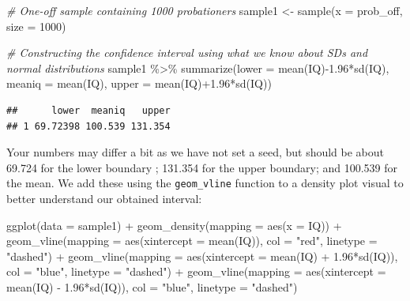 \documentclass[
]{book}
\newenvironment{Shaded}{\begin{snugshade}}{\end{snugshade}}
\newcommand{\AttributeTok}[1]{\textcolor[rgb]{0.77,0.63,0.00}{#1}}
\newcommand{\CommentTok}[1]{\textcolor[rgb]{0.56,0.35,0.01}{\textit{#1}}}
\newcommand{\DecValTok}[1]{\textcolor[rgb]{0.00,0.00,0.81}{#1}}
\newcommand{\FloatTok}[1]{\textcolor[rgb]{0.00,0.00,0.81}{#1}}
\newcommand{\FunctionTok}[1]{\textcolor[rgb]{0.00,0.00,0.00}{#1}}
\newcommand{\NormalTok}[1]{#1}
\newcommand{\OtherTok}[1]{\textcolor[rgb]{0.56,0.35,0.01}{#1}}
\newcommand{\SpecialCharTok}[1]{\textcolor[rgb]{0.00,0.00,0.00}{#1}}
\newcommand{\StringTok}[1]{\textcolor[rgb]{0.31,0.60,0.02}{#1}}
\begin{document}
\begin{Shaded}
\begin{Highlighting}[]
\CommentTok{\# One{-}off sample containing 1000 probationers }
\NormalTok{sample1 }\OtherTok{\textless{}{-}} \FunctionTok{sample}\NormalTok{(}\AttributeTok{x =}\NormalTok{ prob\_off, }\AttributeTok{size =} \DecValTok{1000}\NormalTok{) }

\CommentTok{\# Constructing the confidence interval using what we know about SDs and normal distributions}
\NormalTok{sample1 }\SpecialCharTok{\%\textgreater{}\%} 
  \FunctionTok{summarize}\NormalTok{(}\AttributeTok{lower =} \FunctionTok{mean}\NormalTok{(IQ)}\SpecialCharTok{{-}}\FloatTok{1.96}\SpecialCharTok{*}\FunctionTok{sd}\NormalTok{(IQ), }\AttributeTok{meaniq =} \FunctionTok{mean}\NormalTok{(IQ), }\AttributeTok{upper =}
              \FunctionTok{mean}\NormalTok{(IQ)}\SpecialCharTok{+}\FloatTok{1.96}\SpecialCharTok{*}\FunctionTok{sd}\NormalTok{(IQ))}
\end{Highlighting}
\end{Shaded}

\begin{verbatim}
##      lower  meaniq   upper
## 1 69.72398 100.539 131.354
\end{verbatim}

Your numbers may differ a bit as we have not set a seed, but should be about 69.724 for the lower boundary ; 131.354 for the upper boundary; and 100.539 for the mean. We add these using the \texttt{geom\_vline} function to a density plot visual to better understand our obtained interval:

\begin{Shaded}
\begin{Highlighting}[]
\FunctionTok{ggplot}\NormalTok{(}\AttributeTok{data =}\NormalTok{ sample1) }\SpecialCharTok{+} 
  \FunctionTok{geom\_density}\NormalTok{(}\AttributeTok{mapping =} \FunctionTok{aes}\NormalTok{(}\AttributeTok{x =}\NormalTok{ IQ)) }\SpecialCharTok{+} 
  \FunctionTok{geom\_vline}\NormalTok{(}\AttributeTok{mapping =} \FunctionTok{aes}\NormalTok{(}\AttributeTok{xintercept =} \FunctionTok{mean}\NormalTok{(IQ)), }\AttributeTok{col =} \StringTok{"red"}\NormalTok{, }\AttributeTok{linetype =} \StringTok{"dashed"}\NormalTok{) }\SpecialCharTok{+}
  \FunctionTok{geom\_vline}\NormalTok{(}\AttributeTok{mapping =} \FunctionTok{aes}\NormalTok{(}\AttributeTok{xintercept =} \FunctionTok{mean}\NormalTok{(IQ) }\SpecialCharTok{+} 
                             \FloatTok{1.96}\SpecialCharTok{*}\FunctionTok{sd}\NormalTok{(IQ)), }\AttributeTok{col =} \StringTok{"blue"}\NormalTok{, }\AttributeTok{linetype =} \StringTok{"dashed"}\NormalTok{) }\SpecialCharTok{+}
  \FunctionTok{geom\_vline}\NormalTok{(}\AttributeTok{mapping =} \FunctionTok{aes}\NormalTok{(}\AttributeTok{xintercept =} \FunctionTok{mean}\NormalTok{(IQ) }\SpecialCharTok{{-}} \FloatTok{1.96}\SpecialCharTok{*}\FunctionTok{sd}\NormalTok{(IQ)), }\AttributeTok{col =} \StringTok{"blue"}\NormalTok{, }\AttributeTok{linetype =} \StringTok{"dashed"}\NormalTok{)}
\end{Highlighting}
\end{Shaded}
\end{document}
